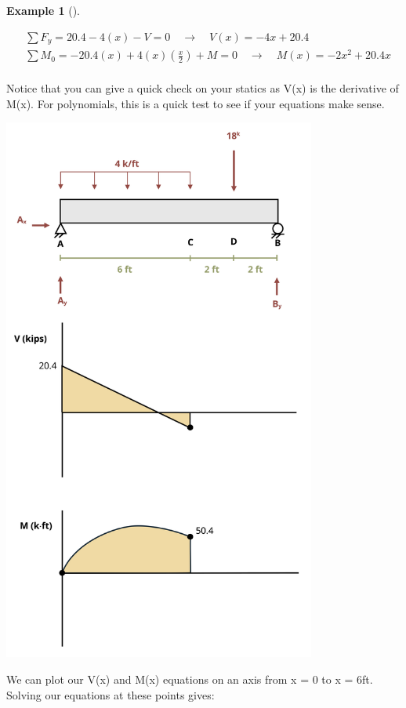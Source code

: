 \documentclass[
  letterpaper,
  DIV=11,
  numbers=noendperiod]{scrreprt}
\theoremstyle{definition}
\newtheorem{example}{Example}[chapter]
\theoremstyle{remark}
\begin{document}
\begin{tcolorbox}
\begin{example}[]
\begin{tcolorbox}
\[
\begin{aligned}
&\sum F_y=20.4-4(x) -V=0 \quad\rightarrow\quad V(x)=-4 x+20.4 \\
&\sum M_0=-20.4(x)+4(x)\left(\frac{x}{2}\right)+M=0 \quad\rightarrow\quad M(x)=-2 x^2+20.4 x \\
\end{aligned}
\]

Notice that you can give a quick check on your statics as V(x) is the
derivative of M(x). For polynomials, this is a quick test to see if your
equations make sense.

\begin{center}
\includegraphics[width=4.05208in,height=\textheight]{images/CH7 PNGs/example 7.2 part 5.png}
\end{center}

We can plot our V(x) and M(x) equations on an axis from x = 0 to x =
6ft. Solving our equations at these points gives:


\end{tcolorbox}
\end{example}
\end{tcolorbox}
\end{document}
